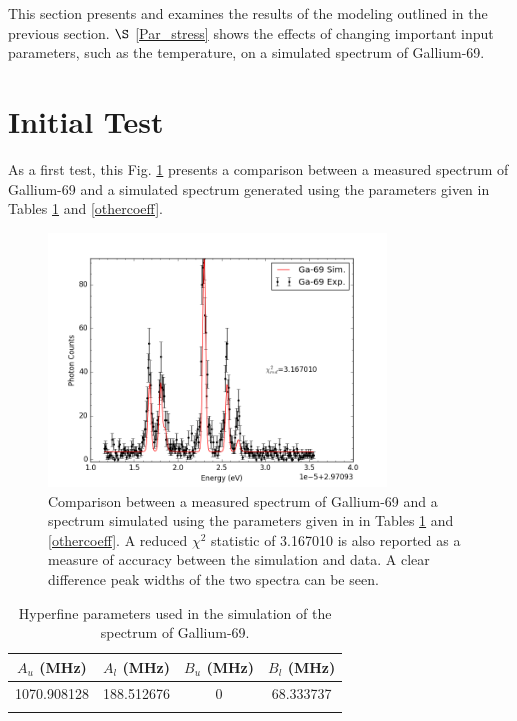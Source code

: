 This section presents and examines the results of the modeling outlined in the previous section. $\S$ \ref{Par_stress} shows the effects of changing important input parameters, such as the temperature, on a simulated spectrum of Gallium-69.  

\section{Initial Test}
As a first test, this Fig. \ref{comp} presents a comparison between a measured spectrum of Gallium-69 and a simulated spectrum generated using the parameters given in Tables \ref{hyperfinecoeff} and \ref{othercoeff}.

\begin{figure}[h]
\centering
\includegraphics[width = 0.8\textwidth]{Graphics/Ga-69-vs-sim.png}
\caption[Comparison between a measured spectrum of Gallium-69 and a spectrum simulated.]{\small Comparison between a measured spectrum of Gallium-69 and a spectrum simulated using the parameters given in in Tables \ref{hyperfinecoeff} and \ref{othercoeff}. A reduced $\chi^2$ statistic of 3.167010 is also reported as a measure of accuracy between the simulation and data. A clear difference peak widths of the two spectra can be seen. }
\label{comp}
\end{figure}

\begin{table}[h]
\centering
\begin{tabular}{c c c c}\hline
$A_u$ (MHz)&$A_l$ (MHz)&$B_u$ (MHz)&$B_l$ (MHz)\\ \hline
1070.908128 & 188.512676 & 0 & 68.333737\\ \hline \\
\end{tabular}
\caption[Hyperfine parameters used in the simulation of the spectrum of Gallium-69.]{\small Hyperfine parameters used in the simulation of the spectrum of Gallium-69.\citep{gapap}}
\label{hyperfinecoeff}
\end{table}

